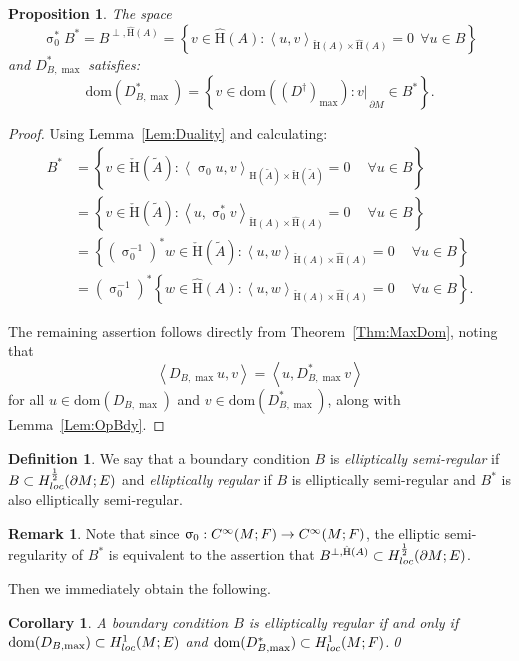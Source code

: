 \documentclass[a4paper,10pt,reqno]{amsart}
\newcommand{\sym}{\upsigma}
\newcommand{\rest}[1]{{{\lvert_{}}_{}}_{#1}}
\newcommand{\dbrac}[1]{\left\{#1\right\}}
\newcommand{\ad}{\ast}
\newcommand{\set}[1]{\dbrac{#1}}
\newcommand{\Ck}[2][{}]{{\rm C}^{#2}_{\rm #1}}%
\newcommand{\Hard}[2][{}]{{\rm H}^{#2}_{\rm #1}}%
\newcommand{\SobH}[2][{}]{\Hard[#1]{\rm #2}}
\newcommand{\checkH}{\check{\mathrm{H}}}
\newcommand{\hatH}{\hat{\mathrm{H}}}
\newcommand{\dom}{\mathrm{dom}}
\newcommand{\inprod}[1]{\left\langle #1 \right\rangle}%
\newcommand{\dM}{\partial M}
\newtheorem{corollary}[theorem]{Corollary}
\newtheorem{proposition}[theorem]{Proposition}
\theoremstyle{definition}
\newtheorem{definition}[theorem]{Definition}
\newtheorem{remark}[theorem]{Remark}
\begin{document}
\begin{proposition}
\label{Prop:AdjBC}
The space  $$\sym_0^\ast B^{\ad} =  B^{\perp, \hatH(A)} = \set{v \in \hatH(A): \inprod{u,v}_{\checkH(A) \times \hatH(A)} = 0\ \ \forall u \in B}$$ and  $D_{B,\max}^\ad$ satisfies:
$$ \dom(D_{B,\max}^\ad)  = \set{v \in \dom( (D^\dagger)_{\max} ): v \rest{\dM} \in B^\ad}.$$
\end{proposition}
\begin{proof}
Using Lemma~\ref{Lem:Duality} and calculating:
\begin{align*}
B^\ad & = \set{v \in \checkH(\tilde{A}): \inprod{\sym_0 u, v}_{\hatH(\tilde{A}) \times \checkH(\tilde{A})} = 0\ \quad\forall u \in B} \\
      & =  \set{v \in \checkH(\tilde{A}): \inprod{u, \sym_0^\ast v}_{\checkH(A) \times \hatH(A)} = 0\ \quad\forall u \in B}           \\
      & =  \set{(\sym_{0}^{-1})^\ast w \in \checkH(\tilde{A}): \inprod{u, w}_{\checkH(A) \times \hatH(A)} = 0\ \quad\forall u \in B}  \\
      & = (\sym_{0}^{-1})^\ast \set{ w \in \hatH(A): \inprod{u, w}_{\checkH(A) \times \hatH(A)} = 0\ \quad\forall u \in B}.
\end{align*}

The remaining assertion follows directly from Theorem~\ref{Thm:MaxDom}, noting that
$$ \inprod{D_{B,\max}u,v} = \inprod{u, D_{B,\max}^\ad v}$$
for all $u \in \dom(D_{B,\max})$ and $v \in \dom(D_{B,\max}^\ad)$, along with Lemma~\ref{Lem:OpBdy}.
\end{proof}


\begin{definition}
\label{Def:EllReg}
We say that a boundary condition $B$ is \emph{elliptically semi-regular} if $B \subset \SobH[loc]{\frac12}(\dM;E)$ and \emph{elliptically regular} if $B$ is elliptically semi-regular and $B^\ad$ is also elliptically semi-regular.
\end{definition}

\begin{remark}
\label{Rem:EllReg}
Note that since $\sym_0: \Ck{\infty}(M;F) \to \Ck{\infty}(M;F)$, the elliptic semi-regularity of $B^\ad$ is equivalent to the assertion that $B^{\perp, \hatH(A)} \subset \SobH[loc]{\frac12}(\dM;E)$.
\end{remark}

Then we immediately obtain the following.

\begin{corollary}
\label{Cor:EllReg}
A boundary condition $B$ is elliptically regular if and only if $\dom(D_{B,\max}) \subset \SobH[loc]{1}(M;E)$ and $\dom(D_{B,\max}^\ast) \subset \SobH[loc]{1}(M;F)$.\hfill\qed
\end{corollary}
\end{document}
